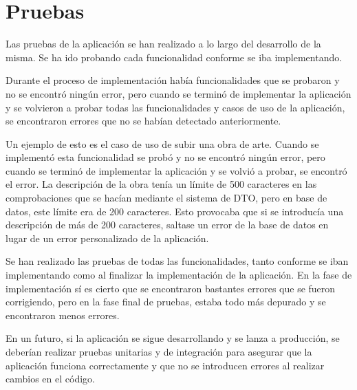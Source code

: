 \chapter{Pruebas}

{ \setlength{\parskip}{6mm} %
Las pruebas de la aplicación se han realizado a lo largo del desarrollo de la misma. Se ha
ido probando cada funcionalidad conforme se iba implementando.

Durante el proceso de implementación había funcionalidades que se \mbox{probaron} y no se
encontró ningún error, pero cuando se terminó de implementar la aplicación y se volvieron
a probar todas las funcionalidades y casos de uso de la aplicación, se encontraron errores
que no se habían detectado anteriormente.

Un ejemplo de esto es el caso de uso de subir una obra de arte. Cuando se implementó
esta funcionalidad se probó y no se encontró ningún error, pero cuando se terminó de
implementar la aplicación y se volvió a probar, se encontró el error. La descripción
de la obra tenía un límite de 500 caracteres en las comprobaciones que se hacían mediante
el sistema de DTO, pero en base de datos, este límite era de 200 caracteres. Esto provocaba
que si se introducía una descripción de más de 200 caracteres, saltase un error de la base de
datos en lugar de un error personalizado de la aplicación.

Se han realizado las pruebas de todas las funcionalidades, tanto conforme se iban
implementando como al finalizar la implementación de la aplicación. En la fase de
implementación sí es cierto que se encontraron bastantes errores que se fueron corrigiendo,
pero en la fase final de pruebas, estaba todo más depurado y se encontraron menos errores.

En un futuro, si la aplicación se sigue desarrollando y se lanza a producción, se deberían
realizar pruebas unitarias y de integración para asegurar que la aplicación funciona
correctamente y que no se introducen errores al realizar cambios en el código.
}